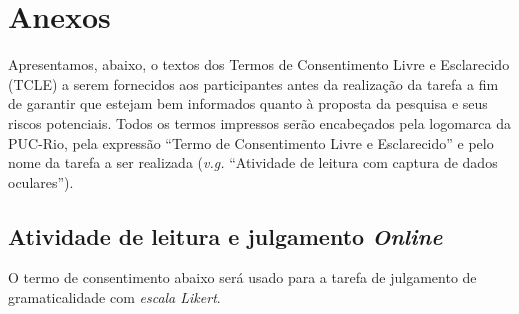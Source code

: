 \chapter{Anexos}
Apresentamos, abaixo, o textos dos Termos de Consentimento Livre e Esclarecido (TCLE) a serem fornecidos aos participantes antes da realização da tarefa a fim de garantir que estejam bem informados quanto à proposta da pesquisa e seus riscos potenciais. Todos os termos impressos serão encabeçados pela logomarca da PUC-Rio, pela expressão ``Termo de Consentimento Livre e Esclarecido'' e pelo nome da tarefa a ser realizada (\emph{v.g.} ``Atividade de leitura com captura de dados oculares'').

\section{Atividade de leitura e julgamento \emph{Online}}
O termo de consentimento abaixo será usado para a tarefa de julgamento de gramaticalidade com \emph{escala Likert}.

